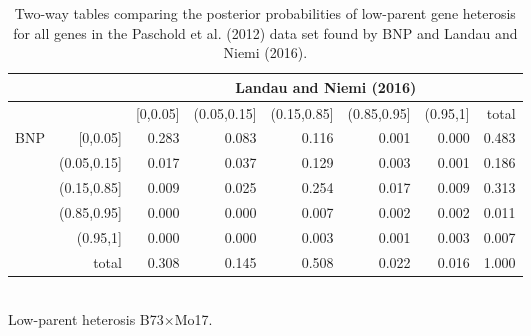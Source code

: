 \begin{table}[ht]
\footnotesize
\centering
\caption{Two-way tables comparing the posterior probabilities of low-parent gene heterosis for all genes in the Paschold et al. (2012) data set found by BNP and Landau and Niemi (2016).}
\label{bayes-compare1}
\begin{tabular}{rrrrrrr|r}
&  &\multicolumn{6}{c}{Landau and Niemi (2016)}\\
  \toprule
&  & [0,0.05] & (0.05,0.15] & (0.15,0.85] & (0.85,0.95] & (0.95,1] & total \\
  \midrule
\multirow{6}{*}{BNP} & [0,0.05]    & 0.283 & 0.083 & 0.116 & 0.001 & 0.000 & 0.483 \\
                     & (0.05,0.15] & 0.017 & 0.037 & 0.129 & 0.003 & 0.001 & 0.186 \\
                     & (0.15,0.85] & 0.009 & 0.025 & 0.254 & 0.017 & 0.009 & 0.313 \\
                     & (0.85,0.95] & 0.000 & 0.000 & 0.007 & 0.002 & 0.002 & 0.011 \\
                     & (0.95,1]    & 0.000 & 0.000 & 0.003 & 0.001 & 0.003 & 0.007 \\
                     \midrule
                     & total       & 0.308 & 0.145 & 0.508 & 0.022 & 0.016 & 1.000 \\
   \bottomrule
\end{tabular}
\\[.5cm]
Low-parent heterosis B73$\times$Mo17.
\\[.75cm]


\end{table}
